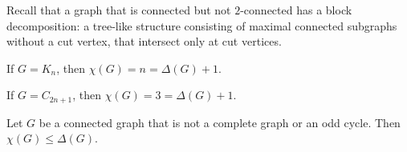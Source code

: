 Recall that a graph that is connected but not \(2\)-connected has a block decomposition: a tree-like structure consisting of maximal connected subgraphs without a cut vertex, that intersect only at cut vertices.

\begin{proposition}
    If \(G = K_n\), then \(\chi(G) = n = \Delta(G) + 1\).
\end{proposition}

\begin{proposition}
    If \(G = C_{2n + 1}\), then \(\chi(G) = 3 = \Delta(G) + 1\).
\end{proposition}

\begin{theorem} \label{thm:brooks-theorem}
    Let \(G\) be a connected graph that is not a complete graph or an odd cycle.
    Then \(\chi(G) \leq \Delta(G)\).
\end{theorem}

